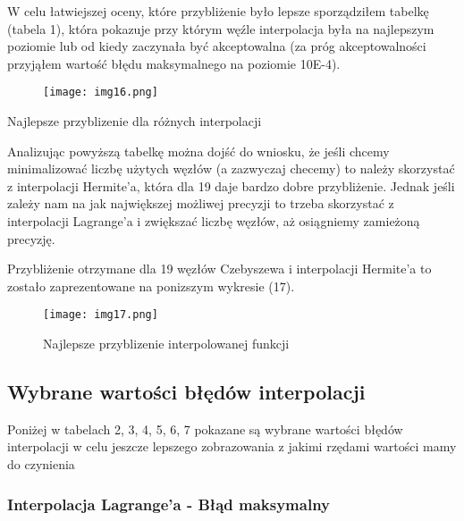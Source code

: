 \documentclass{article}
\begin{document}
W celu łatwiejszej oceny, które przybliżenie było lepsze sporządziłem tabelkę (tabela 1), która pokazuje przy którym węźle interpolacja była na najlepszym poziomie lub od kiedy zaczynała być akceptowalna (za próg akceptowalności przyjąłem wartość błędu maksymalnego na poziomie 10E-4).

\begin{table}[!ht]

\begin{figure}[H]
  \centering
  \begin{minipage}[b]{0.93\textwidth}
    \texttt{[image: img16.png]}
  \end{minipage}
\end{figure}
\caption{Najlepsze przyblizenie dla różnych interpolacji}
\end{table}

Analizując powyższą tabelkę można dojść do wniosku, że jeśli chcemy minimalizować liczbę użytych węzłów (a zazwyczaj checemy) to należy skorzystać z interpolacji Hermite'a, która dla 19 daje bardzo dobre przybliżenie. Jednak jeśli zależy nam na jak największej możliwej precyzji to trzeba skorzystać z interpolacji Lagrange'a i zwiększać liczbę węzłów, aż osiągniemy zamieżoną precyzję.

Przybliżenie otrzymane dla 19 węzłów Czebyszewa i interpolacji Hermite'a to zostało zaprezentowane na ponizszym wykresie (17).

\begin{figure}[H]
  \centering
  \begin{minipage}[b]{0.93\textwidth}
    \texttt{[image: img17.png]}
    \caption{Najlepsze przyblizenie interpolowanej funkcji}
  \end{minipage}
\end{figure}

\subsection{Wybrane wartości błędów interpolacji}

Poniżej w tabelach 2, 3, 4, 5, 6, 7 pokazane są wybrane wartości błędów interpolacji w celu jeszcze lepszego zobrazowania z jakimi rzędami wartości mamy do czynienia

\subsubsection{Interpolacja Lagrange'a - Błąd maksymalny}
\end{document}
